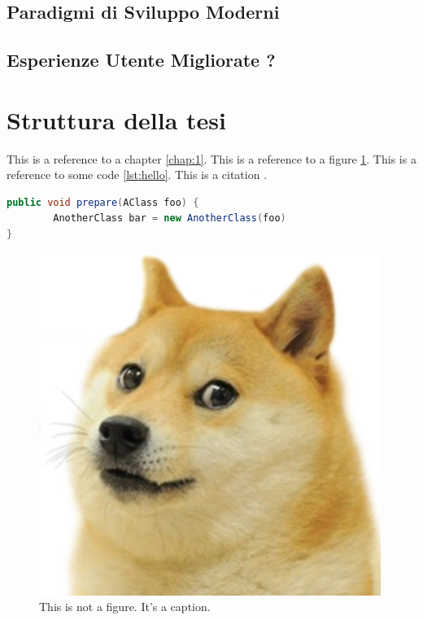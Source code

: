 \subsection{Paradigmi di Sviluppo Moderni}

\subsection{Esperienze Utente Migliorate ?}



\section{Struttura della tesi}
\label{sec:struttura}

This is a reference to a chapter \ref{chap:1}. This is a reference to a figure \ref{fig:doge}. This is a reference to some code \ref{lst:hello}. This is a citation \cite{famous:paper}.



\begin{lstlisting}[language=Java, label=lst:java, caption={Some code in another language than the default one}]
public void prepare(AClass foo) {
        AnotherClass bar = new AnotherClass(foo)
}
\end{lstlisting}


\begin{figure}
\begin{center}
\includegraphics[width=0.3\columnwidth]{images/doge.png}
\end{center}
\caption{This is not a figure. It's a caption.}
\label{fig:doge}
\end{figure}
